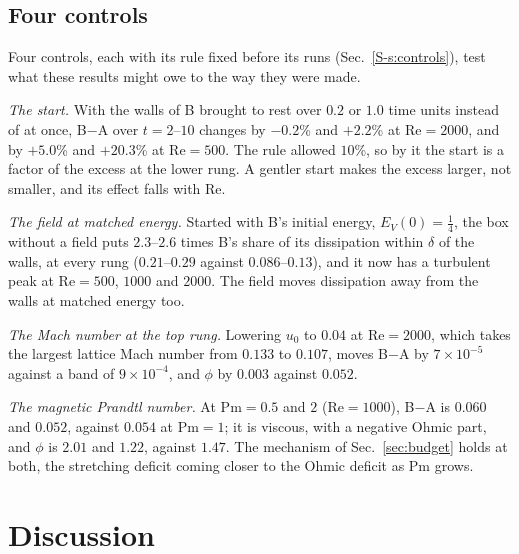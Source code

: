\documentclass[aip,pop,reprint,amsmath,amssymb,superscriptaddress,floatfix]{revtex4-2}
\newcommand{\Rey}{\mathrm{Re}}
\begin{document}
\subsection{Four controls}
\label{sec:controls}

Four controls, each with its rule fixed before its runs (Sec.~\ref{S-s:controls}),
test what these results might owe to the way they were made.

\emph{The start.} With the walls of B brought to rest over $0.2$ or $1.0$ time units
instead of at once, B$-$A over $t=2$--$10$ changes by $-0.2$\% and $+2.2$\% at
$\Rey=2000$, and by $+5.0$\% and $+20.3$\% at $\Rey=500$. The rule allowed $10$\%,
so by it the start is a factor of the excess at the lower rung. A gentler start makes
the excess larger, not smaller, and its effect falls with $\Rey$.

\emph{The field at matched energy.} Started with B's initial energy,
$E_V(0)=\frac14$, the box without a field puts $2.3$--$2.6$ times B's share of its
dissipation within $\delta$ of the walls, at every rung ($0.21$--$0.29$ against
$0.086$--$0.13$), and it now has a turbulent peak at $\Rey=500$, $1000$ and $2000$.
The field moves dissipation away from the walls at matched energy too.

\emph{The Mach number at the top rung.} Lowering $u_0$ to $0.04$ at $\Rey=2000$,
which takes the largest lattice Mach number from $0.133$ to $0.107$, moves B$-$A by
$7\times10^{-5}$ against a band of $9\times10^{-4}$, and $\phi$ by $0.003$ against
$0.052$.

\emph{The magnetic Prandtl number.} At $\mathrm{Pm}=0.5$ and $2$ ($\Rey=1000$), B$-$A
is $0.060$ and $0.052$, against $0.054$ at $\mathrm{Pm}=1$; it is viscous, with a
negative Ohmic part, and $\phi$ is $2.01$ and $1.22$, against $1.47$. The mechanism
of Sec.~\ref{sec:budget} holds at both, the stretching deficit coming closer to the
Ohmic deficit as Pm grows.

\section{Discussion}
\label{sec:discussion}
\end{document}
